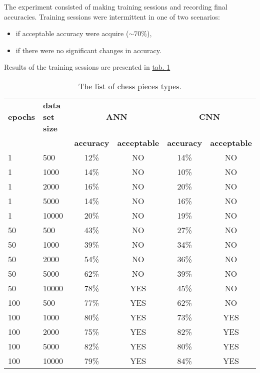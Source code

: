 The experiment consisted of making training sessions and recording final accuracies. Training sessions were intermittent in one of two scenarios:
\begin{itemize}
    \item if acceptable accuracy were acquire ($\sim 70\%$),
    \item if there were no significant changes in accuracy.
\end{itemize}
Results of the training sessions are presented in \hyperref[tab:epochs-dataset-size-testing]{tab. \ref*{tab:epochs-dataset-size-testing}}
\begin{table}
	\centering
	\caption{The list of chess pieces types.}
	\label{tab:epochs-dataset-size-testing}
	\begin{tabular}{ll|cc|cc}
	\toprule
    \textbf{epochs} & \textbf{data set size} & \multicolumn{2}{c}{\textbf{ANN}} & \multicolumn{2}{c}{\textbf{CNN}}\\
		&& \textbf{accuracy} & \textbf{acceptable} & \textbf{accuracy} & \textbf{acceptable}\\
		\hline
			1 & 500 & 12\% & NO & 14\% & NO\\
        \hline
			1 & 1000 & 14\% & NO & 10\% & NO\\
        \hline
			1 & 2000 & 16\% & NO & 20\% & NO\\
        \hline
			1 & 5000 & 14\% & NO & 16\% & NO\\
        \hline
			1 & 10000 & 20\% & NO & 19\% & NO\\
        \toprule[1.5pt]
            50 & 500 & 43\% & NO & 27\% & NO\\
        \hline
			50 & 1000 & 39\% & NO & 34\% & NO\\
        \hline
			50 & 2000 & 54\% & NO & 36\% & NO\\
        \hline
			50 & 5000 & 62\% & NO & 39\% & NO\\
        \hline
			50 & 10000 & 78\% & YES & 45\% & NO\\
        \toprule[1.5pt]
            100 & 500 & 77\% & YES & 62\% & NO\\
        \hline
			100 & 1000 & 80\% & YES & 73\% & YES\\
        \hline
			100 & 2000 & 75\% & YES & 82\% & YES\\
        \hline
			100 & 5000 & 82\% & YES & 80\% & YES\\
        \hline
			100 & 10000 & 79\% & YES & 84\% & YES\\
	\end{tabular}
\end{table}
